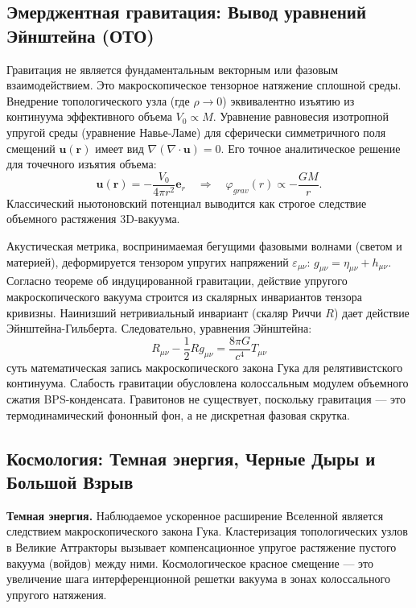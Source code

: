 \documentclass[12pt,a4paper]{article}
\begin{document}
\subsection{Эмерджентная гравитация: Вывод уравнений Эйнштейна (ОТО)}
Гравитация не является фундаментальным векторным или фазовым взаимодействием. Это макроскопическое тензорное натяжение сплошной среды. Внедрение топологического узла (где $\rho \to 0$) эквивалентно изъятию из континуума эффективного объема $V_0 \propto M$. 
Уравнение равновесия изотропной упругой среды (уравнение Навье-Ламе) для сферически симметричного поля смещений $\mathbf{u}(\mathbf{r})$ имеет вид $\nabla(\nabla \cdot \mathbf{u}) = 0$. Его точное аналитическое решение для точечного изъятия объема:
\begin{equation}
\mathbf{u}(\mathbf{r}) = -\frac{V_0}{4\pi r^2}\mathbf{e}_r \quad \Longrightarrow \quad \varphi_{grav}(r) \propto -\frac{GM}{r}.
\end{equation}
Классический ньютоновский потенциал выводится как строгое следствие объемного растяжения 3D-вакуума.

Акустическая метрика, воспринимаемая бегущими фазовыми волнами (светом и материей), деформируется тензором упругих напряжений $\varepsilon_{\mu\nu}$: $g_{\mu\nu} = \eta_{\mu\nu} + h_{\mu\nu}$. Согласно теореме об индуцированной гравитации, действие упругого макроскопического вакуума строится из скалярных инвариантов тензора кривизны. Наинизший нетривиальный инвариант (скаляр Риччи $R$) дает действие Эйнштейна-Гильберта. Следовательно, уравнения Эйнштейна:
\begin{equation}
R_{\mu\nu} - \frac{1}{2}R g_{\mu\nu} = \frac{8\pi G}{c^4} T_{\mu\nu}
\end{equation}
суть математическая запись макроскопического закона Гука для релятивистского континуума. Слабость гравитации обусловлена колоссальным модулем объемного сжатия BPS-конденсата. Гравитонов не существует, поскольку гравитация — это термодинамический фононный фон, а не дискретная фазовая скрутка.

\subsection{Космология: Темная энергия, Черные Дыры и Большой Взрыв}
\textbf{Темная энергия.} Наблюдаемое ускоренное расширение Вселенной является следствием макроскопического закона Гука. Кластеризация топологических узлов в Великие Аттракторы вызывает компенсационное упругое растяжение пустого вакуума (войдов) между ними. Космологическое красное смещение — это увеличение шага интерференционной решетки вакуума в зонах колоссального упругого натяжения.
\end{document}
